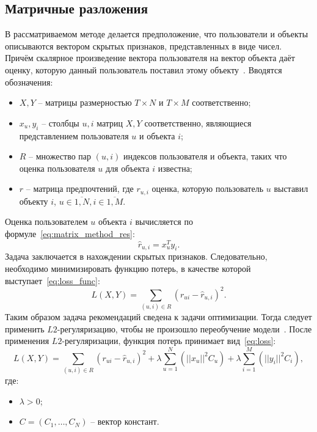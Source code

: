 \subsection{Матричные разложения}
В рассматриваемом методе делается предположение, что пользователи и объекты описываются вектором скрытых признаков, представленных в виде чисел.
Причём скалярное произведение вектора пользователя на вектор объекта даёт оценку, которую данный пользователь поставил этому объекту~\cite{yandex_matrix}.
Вводятся обозначения:
\begin{itemize}
    \item $X, Y$ -- матрицы размерностью $T \times N$ и $T \times M$ соответственно;
    \item $x_u, y_i$ -- столбцы $u, i$ матриц $X, Y$ соответственно, являющиеся представлением пользователя $u$ и объекта $i$;
    \item $R$ -- множество пар $(u, i)$ индексов пользователя и объекта, таких что оценка пользователя $u$ для объекта $i$ известна;
    \item $r$ -- матрица предпочтений, где $r_{u,i}$ оценка, которую пользователь $u$ выставил объекту $i$, $u \in \overline{1, N}, i \in \overline{1, M}$.
\end{itemize}
Оценка пользователем $u$ объекта $i$ вычисляется по формуле~\eqref{eq:matrix_method_res}:
\begin{equation}
\label{eq:matrix_method_res}
    \hat{r}_{u,i} = x_u^Ty_i.
\end{equation}
Задача заключается в нахождении скрытых признаков.
Следовательно, необходимо минимизировать функцию потерь, в качестве которой выступает~\eqref{eq:loss_func}:
\begin{equation}
\label{eq:loss_func}
    L(X, Y) = \sum_{(u, i) \in R}{(r_{ui} - \hat{r}_{u,i})^2}.
\end{equation}
Таким образом задача рекомендаций сведена к задачи оптимизации.
Тогда следует применить $L2$-регуляризацию, чтобы не произошло переобучение модели~\cite{yandex_matrix}.
После применения $L2$-регуляризации, функция потерь принимает вид~\eqref{eq:loss}:
\begin{equation}
    L(X, Y) = \sum_{(u, i) \in R}{(r_{ui} - \hat{r}_{u,i})^2} + \lambda \sum_{u = 1}^{N}{(||x_u||^2C_u)} + \lambda \sum_{i = 1}^{M}{(||y_i||^2C_i)},
    \label{eq:loss}
\end{equation} где:
\begin{itemize}
	\item $\lambda > 0$;
	\item $C=(C_1,\dots,C_N)$ -- вектор констант.
\end{itemize}

